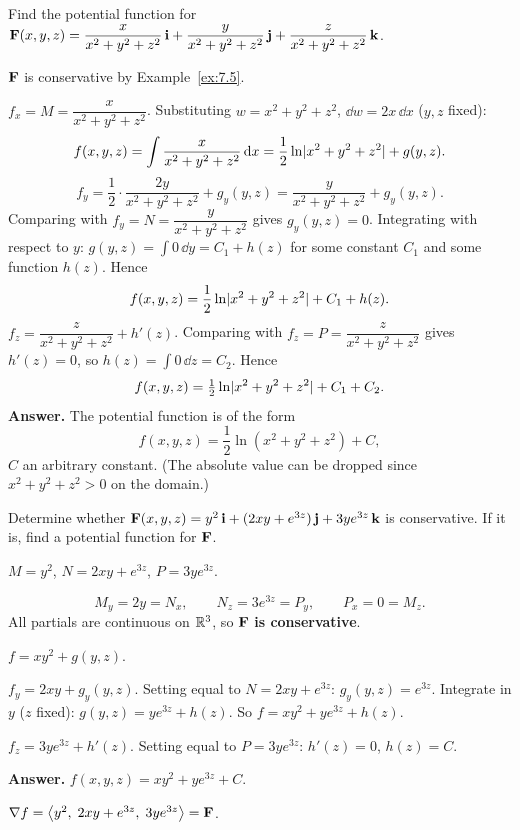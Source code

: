 \begin{example}\label{ex:7.6}
Find the potential function for
$\mathbf{F}(x,y,z)=\dfrac{x}{x^2+y^2+z^2}\,\mathbf{i}+\dfrac{y}{x^2+y^2+z^2}\,\mathbf{j}+\dfrac{z}{x^2+y^2+z^2}\,\mathbf{k}$.
\end{example}
\begin{solution}
$\mathbf{F}$ is conservative by Example~\ref{ex:7.5}.

 $f_x=M=\dfrac{x}{x^2+y^2+z^2}$. Substituting
$w=x^2+y^2+z^2$, $\dd w=2x\,\dd x$ ($y,z$ fixed):
\[
  f(x,y,z)=\int\frac{x}{x^2+y^2+z^2}\,\mathrm{d} x=\frac12\ln\lvert x^2+y^2+z^2\rvert+g(y,z).
\]
\[
  f_y=\frac12\cdot\frac{2y}{x^2+y^2+z^2}+g_y(y,z)=\frac{y}{x^2+y^2+z^2}+g_y(y,z).
\]
Comparing with $f_y=N=\dfrac{y}{x^2+y^2+z^2}$ gives $g_y(y,z)=0$. Integrating with
respect to $y$: $g(y,z)=\int0\,\dd y=C_1+h(z)$ for some constant $C_1$ and some
function $h(z)$. Hence
\[
  f(x,y,z)=\frac12\ln\lvert x^2+y^2+z^2\rvert+C_1+h(z).
\]
$f_z=\dfrac{z}{x^2+y^2+z^2}+h'(z)$. Comparing with $f_z=P=\dfrac{z}{x^2+y^2+z^2}$ gives
$h'(z)=0$, so $h(z)=\int0\,\dd z=C_2$. Hence
\[
  f(x,y,z)=\tfrac12\ln\lvert x^2+y^2+z^2\rvert+C_1+C_2 .
\]
\textbf{Answer.} The potential function is of the form
\[
  f(x,y,z)=\frac12\ln\left(x^2+y^2+z^2\right)+C,
\]
$C$ an arbitrary constant. (The absolute value can be dropped since
$x^2+y^2+z^2>0$ on the domain.)
\end{solution}

\begin{exercise}\label{ex:exercise4}
Determine whether $\mathbf{F}(x,y,z)=y^2\,\mathbf{i}+(2xy+e^{3z})\,\mathbf{j}+3ye^{3z}\,\mathbf{k}$ is
conservative. If it is, find a potential function for $\mathbf{F}$.
\end{exercise}
\begin{solution}
$M=y^2$, $N=2xy+e^{3z}$, $P=3ye^{3z}$.

\[
  M_y=2y=N_x,\qquad N_z=3e^{3z}=P_y,\qquad P_x=0=M_z .
\]
All partials are continuous on $\mathbb{R}^3$, so $\mathbf{F}$ \textbf{is conservative}.

 $f=xy^2+g(y,z)$.

 $f_y=2xy+g_y(y,z)$. Setting equal to
$N=2xy+e^{3z}$: $g_y(y,z)=e^{3z}$. Integrate in $y$ ($z$ fixed):
$g(y,z)=ye^{3z}+h(z)$. So $f=xy^2+ye^{3z}+h(z)$.

 $f_z=3ye^{3z}+h'(z)$. Setting equal to
$P=3ye^{3z}$: $h'(z)=0$, $h(z)=C$.

\textbf{Answer.} $f(x,y,z)=xy^2+ye^{3z}+C$.

 $\nabla f=\left\langle y^2,\;2xy+e^{3z},\;3ye^{3z} \right\rangle=\mathbf{F}$.\checkok
\end{solution}

